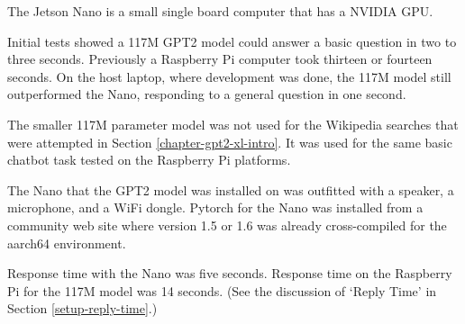 \label{chapter-nano}
The Jetson Nano is a small single board computer that has a NVIDIA GPU. %

Initial tests showed a 117M GPT2 model could answer a basic question in two to three seconds. Previously a Raspberry Pi computer took thirteen or fourteen seconds. On the host laptop, where development was done, the 117M model still outperformed the Nano, responding to a general question in one second.

The smaller 117M parameter model was not used for the Wikipedia searches that were attempted in Section \ref{chapter-gpt2-xl-intro}. It was used for the same basic chatbot task tested on the Raspberry Pi platforms.


The Nano that the GPT2 model was installed on was outfitted with a speaker, a microphone, and a WiFi dongle. Pytorch for the Nano was installed from a community web site where version 1.5 or 1.6 was already cross-compiled for the aarch64 environment. 

Response time with the Nano was five seconds. Response time on the Raspberry Pi for the 117M model was 14 seconds. (See the discussion of `Reply Time' in Section \ref{setup-reply-time}.)

